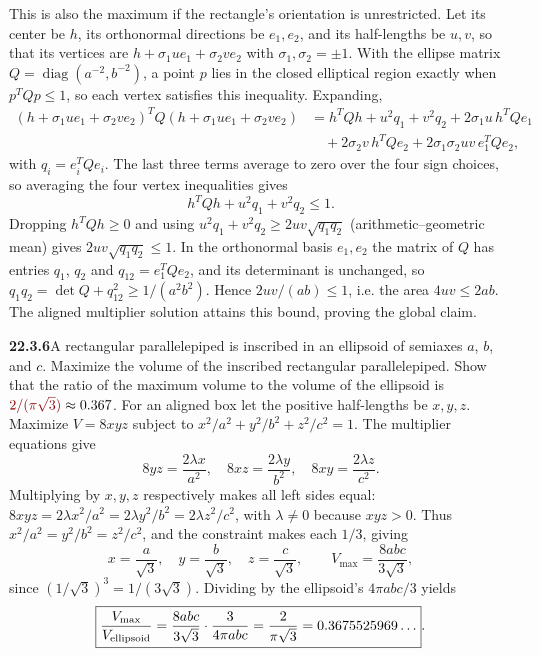 This is also the maximum if the rectangle's orientation is unrestricted.
Let its center be $h$, its orthonormal directions be $e_1,e_2$,
and its half-lengths be $u,v$, so that its vertices are
$h+\sigma_1ue_1+\sigma_2ve_2$ with $\sigma_1,\sigma_2=\pm1$. With the
ellipse matrix $Q=\operatorname{diag}(a^{-2},b^{-2})$, a point $p$ lies
in the closed elliptical region exactly when $p^TQp\le1$, so each vertex
satisfies this inequality. Expanding,
\[
\begin{aligned}
(h+\sigma_1ue_1+\sigma_2ve_2)^TQ(h+\sigma_1ue_1+\sigma_2ve_2)
&=h^TQh+u^2q_1+v^2q_2+2\sigma_1u\,h^TQe_1\\
&\quad+2\sigma_2v\,h^TQe_2+2\sigma_1\sigma_2uv\,e_1^TQe_2,
\end{aligned}
\]
with $q_i=e_i^TQe_i$. The last three terms average to zero over the
four sign choices, so averaging the four vertex inequalities gives
\[
h^TQh+u^2q_1+v^2q_2\le1.
\]
Dropping $h^TQh\ge0$ and using
$u^2q_1+v^2q_2\ge2uv\sqrt{q_1q_2}$ (arithmetic--geometric mean) gives
$2uv\sqrt{q_1q_2}\le1$. In the orthonormal basis $e_1,e_2$ the matrix
of $Q$ has entries $q_1$, $q_2$ and $q_{12}=e_1^TQe_2$, and its
determinant is unchanged, so
$q_1q_2=\det Q+q_{12}^2\ge1/(a^2b^2)$.
Hence $2uv/(ab)\le1$, i.e. the area $4uv\le2ab$. The aligned
multiplier solution attains this bound, proving the global claim.


\par\bigskip
\noindent\textbf{22.3.6}\quad A rectangular parallelepiped is
inscribed in an ellipsoid of semiaxes $a$, $b$, and $c$. Maximize
the volume of the inscribed rectangular parallelepiped. Show
that the ratio of the maximum volume to the volume of the
ellipsoid is $\erratum{2/(\pi\sqrt{3})}\approx0.367$.
\solution
For an aligned box let the positive half-lengths be $x,y,z$.
Maximize $V=8xyz$ subject to
$x^2/a^2+y^2/b^2+z^2/c^2=1$. The multiplier equations give
\[
8yz=\frac{2\lambda x}{a^2},\quad
8xz=\frac{2\lambda y}{b^2},\quad
8xy=\frac{2\lambda z}{c^2}.
\]
Multiplying by $x,y,z$ respectively makes all left sides equal:
$8xyz=2\lambda x^2/a^2=2\lambda y^2/b^2=2\lambda z^2/c^2$, with
$\lambda\ne0$ because $xyz>0$. Thus $x^2/a^2=y^2/b^2=z^2/c^2$, and the
constraint makes each $1/3$, giving
\[
\boxed{x=\frac a{\sqrt3},\quad y=\frac b{\sqrt3},\quad
z=\frac c{\sqrt3},\qquad V_{\max}=\frac{8abc}{3\sqrt3}},
\]
since $(1/\sqrt3)^3=1/(3\sqrt3)$.
Dividing by the ellipsoid's $4\pi abc/3$ yields
\[
\boxed{\frac{V_{\max}}{V_{\rm ellipsoid}}
=\frac{8abc}{3\sqrt3}\cdot\frac{3}{4\pi abc}
=\frac{2}{\pi\sqrt3}=0.3675525969\ldots}.
\]

